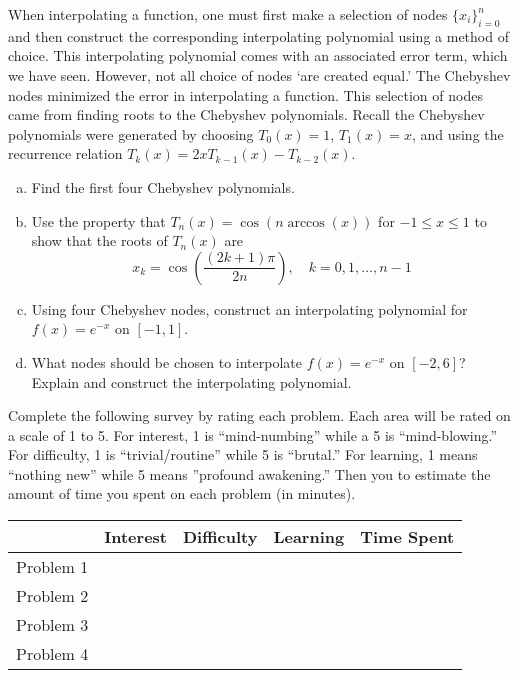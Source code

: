 \documentclass[11pt,letterpaper]{article}
\begin{document}
 When interpolating a function, one must first make a selection of nodes $\{ x_i \}_{i=0}^n$ and then construct the corresponding interpolating polynomial using  a method of choice. This interpolating polynomial comes with an associated error term, which we have seen. However, not all choice of nodes `are created equal.' The Chebyshev nodes minimized the error in interpolating a function. This selection of nodes came from finding roots to the Chebyshev polynomials. Recall the Chebyshev polynomials were generated by choosing $T_0(x)= 1$, $T_1(x)= x$, and using the recurrence relation $T_k(x)= 2x T_{k-1}(x) - T_{k-2}(x)$. 
	\begin{enumerate}[(a)]
	\item Find the first four Chebyshev polynomials. 
	\item Use the property that $T_n(x)= \cos(n \arccos(x))$ for $-1 \leq x \leq 1$ to show that the roots of $T_n(x)$ are 
		\[
		x_k= \cos\left( \dfrac{(2k + 1)\pi}{2n} \right), \quad k= 0, 1, \ldots, n - 1
		\]
	\item Using four Chebyshev nodes, construct an interpolating polynomial for $f(x)= e^{-x}$ on $[-1, 1]$. 
	\item What nodes should be chosen to interpolate $f(x)= e^{-x}$ on $[-2, 6]$? Explain and construct the interpolating polynomial. 
	\end{enumerate}



\newpage



 \pvspace{0.3cm}

Complete the following survey by rating each problem. Each area will be rated on a scale of 1 to 5. For interest, 1 is ``mind-numbing'' while a 5 is ``mind-blowing.'' For difficulty, 1 is ``trivial/routine'' while 5 is ``brutal.'' For learning, 1 means ``nothing new'' while 5 means ''profound awakening.'' Then you to estimate the amount of time you spent on each problem (in minutes). 

\vspace{0.25cm}
\begin{center}
\begin{tabular}{c||c|c|c|c|}
 & Interest & Difficulty & Learning & Time Spent \\ \hline \hline
Problem 1 &  &  &  &  \\ \hline
Problem 2 &  &  &  &  \\ \hline
Problem 3 &  &  &  &  \\ \hline
Problem 4 &  &  &  &  
\end{tabular}
\end{center}
\vspace{0.25cm}
\end{document}
